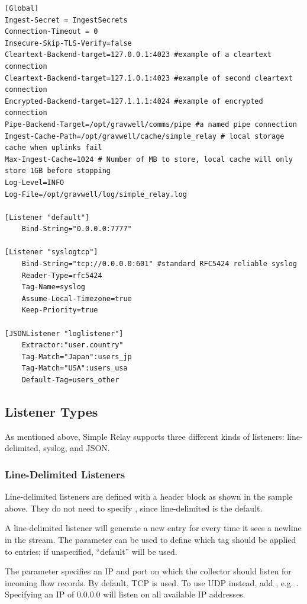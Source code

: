 \begin{Verbatim}[breaklines=true]
[Global]
Ingest-Secret = IngestSecrets
Connection-Timeout = 0
Insecure-Skip-TLS-Verify=false
Cleartext-Backend-target=127.0.0.1:4023 #example of a cleartext connection
Cleartext-Backend-target=127.1.0.1:4023 #example of second cleartext connection
Encrypted-Backend-target=127.1.1.1:4024 #example of encrypted connection
Pipe-Backend-Target=/opt/gravwell/comms/pipe #a named pipe connection
Ingest-Cache-Path=/opt/gravwell/cache/simple_relay # local storage cache when uplinks fail
Max-Ingest-Cache=1024 # Number of MB to store, local cache will only store 1GB before stopping
Log-Level=INFO
Log-File=/opt/gravwell/log/simple_relay.log

[Listener "default"]
    Bind-String="0.0.0.0:7777" 

[Listener "syslogtcp"]
    Bind-String="tcp://0.0.0.0:601" #standard RFC5424 reliable syslog
    Reader-Type=rfc5424
    Tag-Name=syslog
    Assume-Local-Timezone=true
    Keep-Priority=true

[JSONListener "loglistener"]
    Extractor:"user.country"
    Tag-Match="Japan":users_jp
    Tag-Match="USA":users_usa
    Default-Tag=users_other
\end{Verbatim}

\subsection{Listener Types}

As mentioned above, Simple Relay supports three different kinds of
listeners: line-delimited, syslog, and JSON. 

\subsubsection*{Line-Delimited Listeners}

Line-delimited listeners are defined with a  header block as shown in the sample above. They
do not need to specify , since line-delimited is the
default.

A line-delimited listener will generate a new entry for every time it
sees a newline in the stream. The  parameter can be used to
define which tag should be applied to entries; if unspecified,
``default'' will be used.

The  parameter specifies an IP and port on which
the collector should listen for incoming flow records. By default, TCP is used.
To use UDP instead, add , e.g. .
Specifying an IP of 0.0.0.0 will listen on all available IP addresses.

